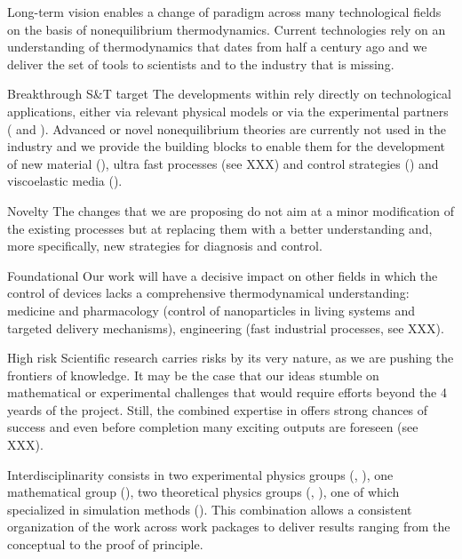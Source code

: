 \begin{compactdesc}
\item[Long-term vision] \TheProject enables a change of paradigm across many technological
fields on the basis of nonequilibrium thermodynamics. Current technologies rely on an
understanding of thermodynamics that dates from half a century ago and we deliver the
set of tools to scientists and to the industry that is missing.
\item[Breakthrough S\&T target] The developments within \TheProject rely directly on
technological applications, either via relevant physical models or via the experimental
partners ( and ). Advanced or novel nonequilibrium theories are
currently not used in the industry and we provide the building blocks to enable them
for the development of new material (), ultra fast processes (see XXX)
and control strategies () and viscoelastic media ().
\item[Novelty] The changes that we are proposing do not aim at a minor modification of the
existing processes but at replacing them with a better understanding and, more specifically,
new strategies for diagnosis and control.
\item[Foundational] Our work will have a decisive impact on other fields in which the
control of devices lacks a comprehensive thermodynamical understanding: medicine and
pharmacology (control of nanoparticles in living systems and targeted delivery mechanisms),
engineering (fast industrial processes, see XXX).
\item[High risk] Scientific research carries risks by its very nature, as we are pushing the
frontiers of knowledge. It may be the case that our ideas stumble on mathematical or
experimental challenges that would require efforts beyond the 4 yeards of the
project. Still, the combined expertise in \TheProject offers strong chances of success and
even before completion many exciting outputs are foreseen (see XXX).
\item[Interdisciplinarity] \TheProject consists in two experimental physics groups
(, ), one mathematical group (), two theoretical physics
groups (, ), one of which specialized in simulation methods
(). This combination allows a consistent organization of the work across work
packages to deliver results ranging from the conceptual to the proof of principle.
\end{compactdesc}

